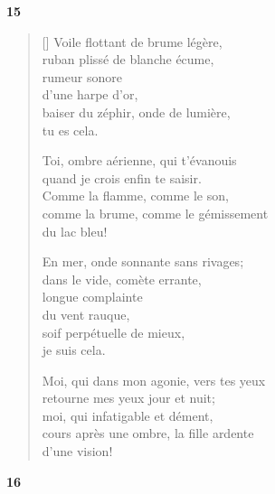 \documentclass[a4paper,12pt]{book}
\begin{document}
\bigskip

\begin{center}
  \textbf{15}
\end{center}

\settowidth{\versewidth}{Moi, qui dans mon agonie, vers tes yeux}

\begin{verse}[\versewidth]
  Voile flottant de brume légère, \\
  ruban plissé de blanche écume, \\
  rumeur sonore \\
  d'une harpe d'or, \\
  baiser du zéphir, onde de lumière, \\
  tu es cela.

  Toi, ombre aérienne, qui t'évanouis \\
  quand je crois enfin te saisir. \\
  Comme la flamme, comme le son, \\
  comme la brume, comme le gémissement \\
  du lac bleu!

  En mer, onde sonnante sans rivages; \\
  dans le vide, comète errante, \\
  longue complainte \\
  du vent rauque, \\
  soif perpétuelle de mieux, \\
  je suis cela.

  Moi, qui dans mon agonie, vers tes yeux \\
  retourne mes yeux jour et nuit; \\
  moi, qui infatigable et dément, \\
  cours après une ombre, la fille ardente \\
  d'une vision!
\end{verse}

\bigskip

\begin{center}
  \textbf{16}
\end{center}

\settowidth{\versewidth}{Si, quand les clochettes bleues de ton balcon}
\end{document}
